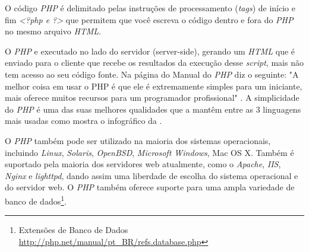 \par
O código \textit{PHP} é delimitado pelas instruções de processamento (\textit{tags}) de início e fim \textit{<?php e ?>} que permitem que você escreva o código dentro e fora do \textit{PHP} no mesmo arquivo \textit{HTML}. \cite{php-intro}
\par
O \textit{PHP} e executado no lado do servidor (server-side), gerando um \textit{HTML} que é enviado para o cliente que recebe os resultados da execução desse \textit{script}, mais não tem acesso ao seu código fonte. Na página do Manual do \textit{PHP} diz o seguinte: "A melhor coisa em usar o PHP é que ele é extremamente simples para um iniciante, mais oferece muitos recursos para um programador profissional" . A simplicidade do \textit{PHP} é uma das suas melhores qualidades que a mantêm entre as 3 linguagens mais usadas como mostra o infográfico da .
\par
O \textit{PHP} também pode ser utilizado na maioria dos sistemas operacionais, incluindo \textit{Linux}, \textit{Solaris}, \textit{OpenBSD}, \textit{Microsoft Windows}, Mac OS X. Também é suportado pela maioria dos servidores web atualmente, como o \textit{Apache}, \textit{IIS}, \textit{Nginx} e \textit{lighttpd}, dando assim uma liberdade de escolha do sistema operacional e do servidor web. O \textit{PHP} também oferece suporte para uma ampla variedade de banco de dados\footnote{Extensões de Banco de Dados \url{http://php.net/manual/pt_BR/refs.database.php}}.
